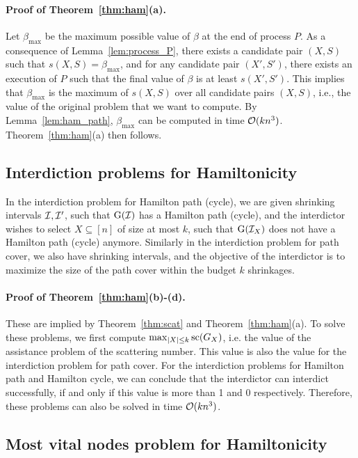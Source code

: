\paragraph*{Proof of Theorem~\ref{thm:ham}(a).}
Let $\beta_{\max}$ be the maximum possible value of $\beta$ at the end of process $P$.
As a consequence of Lemma~\ref{lem:process_P}, there exists a candidate pair $(X,S)$ such that $s(X,S) = \beta_{\max}$, and
for any candidate pair $(X',S')$, there exists an execution of $P$ such that the final value of $\beta$ is at least $s(X',S')$.
This implies that $\beta_{\max}$ is the maximum of $s(X,S)$ over all candidate pairs $(X,S)$, i.e., the value of the original problem that we want to compute.
By Lemma~\ref{lem:ham_path}, $\beta_{\max}$ can be computed in time $\mathcal{O}(kn^3)$.
Theorem~\ref{thm:ham}(a) then follows.
 

\subsection{Interdiction problems for Hamiltonicity}
\label{subsection:ham_interdict}

In the interdiction problem for Hamilton path (cycle), we are given shrinking intervals $\mathcal{I}, \mathcal{I}'$, such that $\operatorname{G}(\mathcal{I})$ has a Hamilton path (cycle), and the interdictor wishes to select $X \subseteq [n]$ of size at most $k$, such that $\operatorname{G}(\mathcal{I}_X)$ does not have a Hamilton path (cycle) anymore.
Similarly in the interdiction problem for path cover, we also have shrinking intervals, and the objective of the interdictor is to maximize the size of the path cover within the budget $k$ shrinkages.

\paragraph*{Proof of Theorem~\ref{thm:ham}(b)-(d).}
These are implied by Theorem~\ref{thm:scat} and Theorem~\ref{thm:ham}(a).
To solve these problems, we first compute $\max_{|X| \leq k}\text{sc}(G_X)$, i.e. the value of the assistance problem of the scattering number.
This value is also the value for the interdiction problem for path cover.
For the interdiction problems for Hamilton path and Hamilton cycle, we can conclude that the interdictor can interdict successfully, if and only if this value is more than 1 and 0 respectively.
Therefore, these problems can also be solved in time $\mathcal{O}(kn^3)$.
 

\subsection{Most vital nodes problem for Hamiltonicity}
\label{subsection:ham_mvn}


